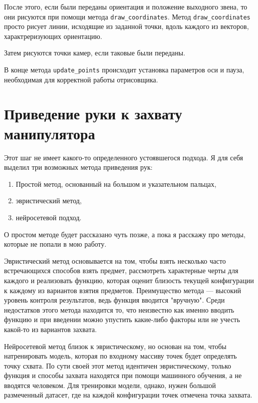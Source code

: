 \documentclass[12pt, a4paper]{article}
\begin{document}
После этого, если были переданы ориентация и положение выходного звена, то они
рисуются при помощи метода \texttt{draw\_coordinates}.
Метод \texttt{draw\_coordinates} просто рисует линии, исходящие из заданной
точки, вдоль каждого из векторов, характреризующих ориентацию.

Затем рисуются точки камер, если таковые были переданы.

В конце метода \texttt{update\_points} происходит установка параметров оси и
пауза, необходимая для корректной работы отрисовщика.


\section{Приведение руки к захвату манипулятора}
Этот шаг не имеет какого-то определенного устоявшегося подхода. Я для
себя выделил три возможных метода приведения рук:
\begin{enumerate}
    \item Простой метод, основанный на большом и указательном пальцах,
    \item эвристический метод,
    \item нейросетевой подход.
\end{enumerate}
О простом методе будет рассказано чуть позже, а пока я расскажу про методы,
которые не попали в мою работу.

Эвристический метод основывается на том, чтобы взять несколько часто
встречающихся способов взять предмет, рассмотреть характерные черты для каждого
и реализовать функцию, которая оценит близость текущей конфигурации к каждому
из вариантов взятия предметов. Преимущество метода --- высокий уровень контроля
результатов, ведь функция вводится "вручную". Среди недостатков этого метода
находится то, что неизвестно как именно вводить функцию и при введении можно
упустить какие-либо факторы или не учесть какой-то из вариантов захвата.

Нейросетевой метод близок к эвристическому, но основан на том, чтобы
натренировать модель, которая по входному массиву точек будет определять точку
схвата. По сути своей этот метод идентичен эвристическому, только функция и
способы захвата находятся при помощи машинного обучения, а не вводятся
человеком. Для тренировки модели, однако, нужен большой размеченный датасет,
где на каждой конфигурации точек отмечена точка захвата.
\end{document}
